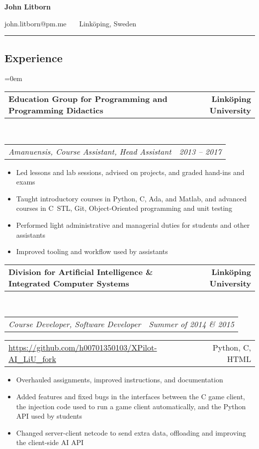 \documentclass[10pt,letterpaper]{article}
\makeatletter
\newcommand{\headerrow}[2]
{\begin{tabular*}{\linewidth}{l@{\extracolsep{\fill}}r}
	#1 &
	#2 \\
\end{tabular*}}
\newcommand{\CPP}
{C\nolinebreak[4]\hspace{-.05em}\raisebox{.22ex}{\footnotesize\bf ++}}
\makeatother
\begin{document}
\begin{center}
    {\LARGE \textbf{John Litborn}}

    john.litborn@pm.me
    \ \textbullet \ \
    Linköping, Sweden
\end{center}

\hrule
\vspace{-0.4em}
\subsection*{Experience}

\parindent=0em
\headerrow
{\textbf{Education Group for Programming and Programming
Didactics}}
{\textbf{Linköping University}}
\\
\headerrow
{\emph{Amanuensis, Course Assistant, Head Assistant}}
{\emph{2013 -- 2017}}
\begin{itemize}[noitemsep, topsep=0pt]
    \item Led lessons and lab sessions, advised on projects, and graded
        hand-ins and exams
    \item Taught introductory courses in Python, \CPP, Ada, and Matlab, and
        advanced courses in \CPP \ STL, Git, Object-Oriented programming and
        unit testing
    \item Performed light administrative and managerial duties for students
        and other assistants
    \item Improved tooling and workflow used by assistants
\end{itemize}
\vspace{0.5em}
\headerrow
{\textbf{Division for Artificial Intelligence \& Integrated Computer Systems}}
{\textbf{Linköping University}}
\\
\headerrow
{\emph{Course Developer, Software Developer}}
{\emph{Summer of 2014 \& 2015}}
\headerrow
{\url{https://github.com/h00701350103/XPilot-AI\_LiU\_fork}}
{Python, C, HTML}
\begin{itemize}[noitemsep, topsep=0pt]
    \item Overhauled assignments, improved instructions, and
        documentation
    \item Added features and fixed bugs in the interfaces
        between the C game client, the injection code used to run a game
        client automatically, and the Python API used by students
    \item Changed server-client netcode to send extra data, offloading and
        improving the client-side AI API
\end{itemize}
\vspace{0.5em}
\end{document}
